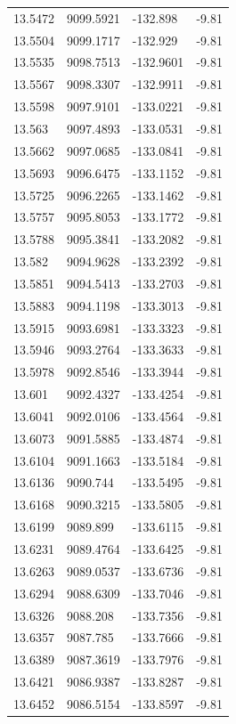 \begin{table}[H]
\begin{tabular}{llll}
13.5472 & 9099.5921 & -132.898 & -9.81 \\
13.5504 & 9099.1717 & -132.929 & -9.81 \\
13.5535 & 9098.7513 & -132.9601 & -9.81 \\
13.5567 & 9098.3307 & -132.9911 & -9.81 \\
13.5598 & 9097.9101 & -133.0221 & -9.81 \\
13.563 & 9097.4893 & -133.0531 & -9.81 \\
13.5662 & 9097.0685 & -133.0841 & -9.81 \\
13.5693 & 9096.6475 & -133.1152 & -9.81 \\
13.5725 & 9096.2265 & -133.1462 & -9.81 \\
13.5757 & 9095.8053 & -133.1772 & -9.81 \\
13.5788 & 9095.3841 & -133.2082 & -9.81 \\
13.582 & 9094.9628 & -133.2392 & -9.81 \\
13.5851 & 9094.5413 & -133.2703 & -9.81 \\
13.5883 & 9094.1198 & -133.3013 & -9.81 \\
13.5915 & 9093.6981 & -133.3323 & -9.81 \\
13.5946 & 9093.2764 & -133.3633 & -9.81 \\
13.5978 & 9092.8546 & -133.3944 & -9.81 \\
13.601 & 9092.4327 & -133.4254 & -9.81 \\
13.6041 & 9092.0106 & -133.4564 & -9.81 \\
13.6073 & 9091.5885 & -133.4874 & -9.81 \\
13.6104 & 9091.1663 & -133.5184 & -9.81 \\
13.6136 & 9090.744 & -133.5495 & -9.81 \\
13.6168 & 9090.3215 & -133.5805 & -9.81 \\
13.6199 & 9089.899 & -133.6115 & -9.81 \\
13.6231 & 9089.4764 & -133.6425 & -9.81 \\
13.6263 & 9089.0537 & -133.6736 & -9.81 \\
13.6294 & 9088.6309 & -133.7046 & -9.81 \\
13.6326 & 9088.208 & -133.7356 & -9.81 \\
13.6357 & 9087.785 & -133.7666 & -9.81 \\
13.6389 & 9087.3619 & -133.7976 & -9.81 \\
13.6421 & 9086.9387 & -133.8287 & -9.81 \\
13.6452 & 9086.5154 & -133.8597 & -9.81 \\

\end{tabular}
\end{table}
